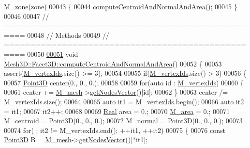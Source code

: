 \begin{DoxyCode}
      \hyperlink{classFVCode3D_1_1Mesh3D_1_1Facet3D_afdbaf5ef57c9020b773f4fcf1e6131bb}{M\_zone}(zone)
00043 \{
00044     \hyperlink{classFVCode3D_1_1Mesh3D_1_1Facet3D_af4fe5bce97fc48c94fdcf667941c21b8}{computeCentroidAndNormalAndArea}();
00045 \}
00046 
00047 \textcolor{comment}{// ==================================================}
00048 \textcolor{comment}{// Methods}
00049 \textcolor{comment}{// ==================================================}
00050 
\hypertarget{Mesh3D_8cpp_source.tex_l00051}{}\hyperlink{classFVCode3D_1_1Mesh3D_1_1Facet3D_af4fe5bce97fc48c94fdcf667941c21b8}{00051} \textcolor{keywordtype}{void} \hyperlink{classFVCode3D_1_1Mesh3D_1_1Facet3D_af4fe5bce97fc48c94fdcf667941c21b8}{Mesh3D::Facet3D::computeCentroidAndNormalAndArea}()
00052 \{
00053     assert(\hyperlink{classFVCode3D_1_1Mesh3D_1_1Facet3D_ae763d815d2b4406b2f09d0ee5133392c}{M\_vertexIds}.size() >= 3);
00054 
00055     \textcolor{keywordflow}{if}(\hyperlink{classFVCode3D_1_1Mesh3D_1_1Facet3D_ae763d815d2b4406b2f09d0ee5133392c}{M\_vertexIds}.size() > 3)
00056     \{
00057         \hyperlink{classFVCode3D_1_1Point3D}{Point3D} center(0., 0., 0.);
00058 
00059         \textcolor{keywordflow}{for}(\textcolor{keyword}{auto} \textcolor{keywordtype}{id} : \hyperlink{classFVCode3D_1_1Mesh3D_1_1Facet3D_ae763d815d2b4406b2f09d0ee5133392c}{M\_vertexIds})
00060         \{
00061             center += \hyperlink{classFVCode3D_1_1Mesh3D_1_1Facet3D_adf8cf45ade4804389de18428aea4969d}{M\_mesh}->\hyperlink{classFVCode3D_1_1Mesh3D_a04162ec60e0fe52674b3ecbb7de1185c}{getNodesVector}()[id];
00062         \}
00063         center /= M\_vertexIds.size();
00064 
00065         \textcolor{keyword}{auto} it1 = M\_vertexIds.begin();
00066         \textcolor{keyword}{auto} it2 = it1;
00067         it2++;
00068 
00069         \hyperlink{namespaceFVCode3D_a40c1f5588a248569d80aa5f867080e83}{Real} area = 0.;
00070         \hyperlink{classFVCode3D_1_1Mesh3D_1_1Facet3D_a464195f44615c5dcba666c6ec3fde430}{M\_area} = 0.;
00071         \hyperlink{classFVCode3D_1_1Mesh3D_1_1Facet3D_a6f7dafb218d207354ad6454f4825728f}{M\_centroid} = \hyperlink{classFVCode3D_1_1Point3D}{Point3D}(0., 0., 0.);
00072         \hyperlink{classFVCode3D_1_1Mesh3D_1_1Facet3D_ada6d0c218b56473802d91a34f2ecc4cf}{M\_normal} = \hyperlink{classFVCode3D_1_1Point3D}{Point3D}(0., 0., 0.);
00073 
00074         \textcolor{keywordflow}{for}( ; it2 != M\_vertexIds.end(); ++it1, ++it2)
00075         \{
00076             \textcolor{keyword}{const} \hyperlink{classFVCode3D_1_1Point3D}{Point3D} B = \hyperlink{classFVCode3D_1_1Mesh3D_1_1Facet3D_adf8cf45ade4804389de18428aea4969d}{M\_mesh}->\hyperlink{classFVCode3D_1_1Mesh3D_a04162ec60e0fe52674b3ecbb7de1185c}{getNodesVector}()[*it1];

\end{DoxyCode}
